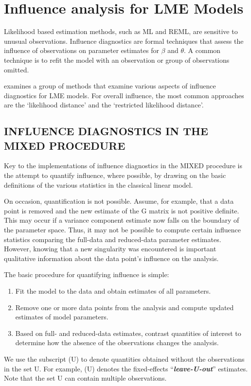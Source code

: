 \documentclass[Main.tex]{subfiles}
\begin{document}
		\section{Influence analysis for LME Models} %
		
		Likelihood based estimation methods, such as ML and REML, are sensitive to unusual observations. Influence diagnostics are formal techniques that assess the influence of observations on parameter estimates for $\beta$ and $\theta$. A common technique is to refit the model with an observation or group of observations omitted.
		
		\citet{west} examines a group of methods that examine various aspects of influence diagnostics for LME models.
		For overall influence, the most common approaches are the `likelihood distance' and the `restricted likelihood distance'.
		
		

		
		
		\subsection{INFLUENCE DIAGNOSTICS IN THE MIXED PROCEDURE}
		Key to the implementations of influence diagnostics in the MIXED procedure is the attempt to quantify
		influence, where possible, by drawing on the basic definitions of the various statistics in the classical linear
		model. 
		
		On occasion, quantification is not possible. Assume, for example, that a data point is removed
		and the new estimate of the G matrix is not positive definite. This may occur if a variance component
		estimate now falls on the boundary of the parameter space. Thus, it may not be possible to compute certain
		influence statistics comparing the full-data and reduced-data parameter estimates. However, knowing that
		a new singularity was encountered is important qualitative information about the data point’s influence on
		the analysis.
		
		The basic procedure for quantifying influence is simple:
		
		\begin{enumerate}
			\item Fit the model to the data and obtain estimates of all parameters.
			\item Remove one or more data points from the analysis and compute updated estimates of model parameters.
			\item Based on full- and reduced-data estimates, contrast quantities of interest to determine how the absence
			of the observations changes the analysis.
		\end{enumerate}
		We use the subscript (U) to denote quantities obtained without the observations in the set U. For example,
		(U) denotes the fixed-effects “\textit{\textbf{leave-U-out}}” estimates. Note that the set U can contain multiple observations.
		
\end{document}
